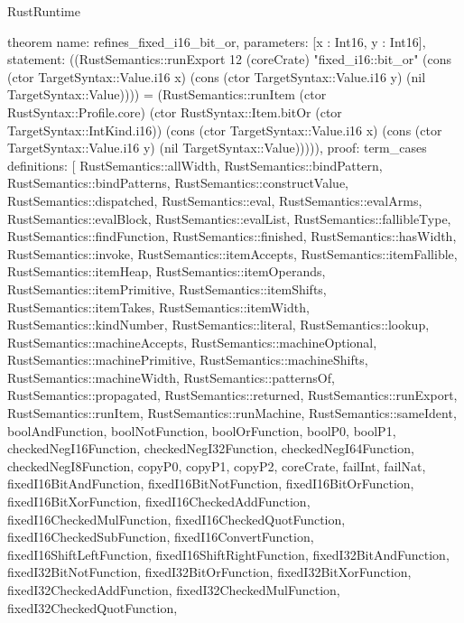 \begin{lexlean}{RustRuntime}
\begin{semanticmodule}
theorem{
  name: refines_fixed_i16_bit_or,
  parameters: [x : Int16, y : Int16],
  statement: ((RustSemantics::runExport 12 (coreCrate) "fixed_i16::bit_or" (cons (ctor TargetSyntax::Value.i16 x) (cons (ctor TargetSyntax::Value.i16 y) (nil TargetSyntax::Value)))) = (RustSemantics::runItem (ctor RustSyntax::Profile.core) (ctor RustSyntax::Item.bitOr (ctor TargetSyntax::IntKind.i16)) (cons (ctor TargetSyntax::Value.i16 x) (cons (ctor TargetSyntax::Value.i16 y) (nil TargetSyntax::Value))))),
  proof: term_cases{
    definitions: [
      RustSemantics::allWidth,
      RustSemantics::bindPattern,
      RustSemantics::bindPatterns,
      RustSemantics::constructValue,
      RustSemantics::dispatched,
      RustSemantics::eval,
      RustSemantics::evalArms,
      RustSemantics::evalBlock,
      RustSemantics::evalList,
      RustSemantics::fallibleType,
      RustSemantics::findFunction,
      RustSemantics::finished,
      RustSemantics::hasWidth,
      RustSemantics::invoke,
      RustSemantics::itemAccepts,
      RustSemantics::itemFallible,
      RustSemantics::itemHeap,
      RustSemantics::itemOperands,
      RustSemantics::itemPrimitive,
      RustSemantics::itemShifts,
      RustSemantics::itemTakes,
      RustSemantics::itemWidth,
      RustSemantics::kindNumber,
      RustSemantics::literal,
      RustSemantics::lookup,
      RustSemantics::machineAccepts,
      RustSemantics::machineOptional,
      RustSemantics::machinePrimitive,
      RustSemantics::machineShifts,
      RustSemantics::machineWidth,
      RustSemantics::patternsOf,
      RustSemantics::propagated,
      RustSemantics::returned,
      RustSemantics::runExport,
      RustSemantics::runItem,
      RustSemantics::runMachine,
      RustSemantics::sameIdent,
      boolAndFunction,
      boolNotFunction,
      boolOrFunction,
      boolP0,
      boolP1,
      checkedNegI16Function,
      checkedNegI32Function,
      checkedNegI64Function,
      checkedNegI8Function,
      copyP0,
      copyP1,
      copyP2,
      coreCrate,
      failInt,
      failNat,
      fixedI16BitAndFunction,
      fixedI16BitNotFunction,
      fixedI16BitOrFunction,
      fixedI16BitXorFunction,
      fixedI16CheckedAddFunction,
      fixedI16CheckedMulFunction,
      fixedI16CheckedQuotFunction,
      fixedI16CheckedSubFunction,
      fixedI16ConvertFunction,
      fixedI16ShiftLeftFunction,
      fixedI16ShiftRightFunction,
      fixedI32BitAndFunction,
      fixedI32BitNotFunction,
      fixedI32BitOrFunction,
      fixedI32BitXorFunction,
      fixedI32CheckedAddFunction,
      fixedI32CheckedMulFunction,
      fixedI32CheckedQuotFunction,
}}
\end{semanticmodule}
\end{lexlean}
